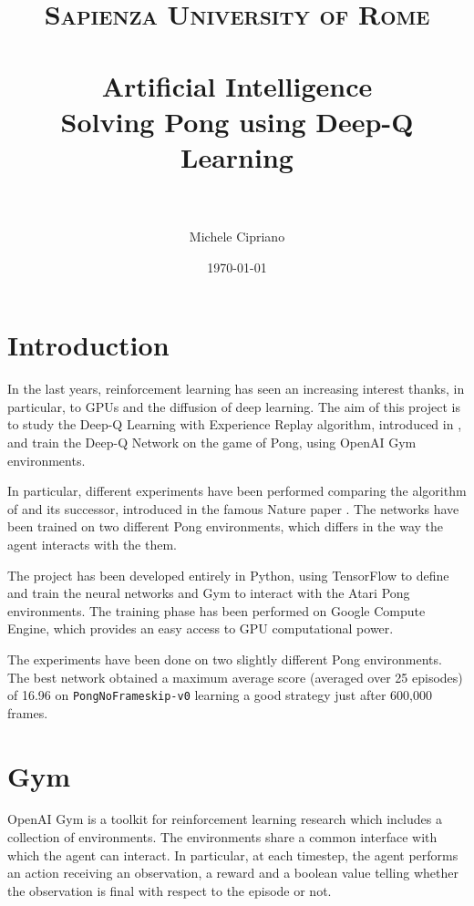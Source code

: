 \documentclass[a4paper]{article}
\title{
\normalfont \normalsize
\textsc{Sapienza University of Rome} \\ [25pt] %
\horrule{0.5pt} \\[0.4cm] %
\LARGE Artificial Intelligence \\ %
\large Solving Pong using Deep-Q Learning \\
\horrule{2pt} \\[0.5cm] %
}
\author{Michele Cipriano} %
\date{\normalsize\today} %
\numberwithin{equation}{section} %
\numberwithin{figure}{section} %
\numberwithin{table}{section} %
\theoremstyle{definition}
\begin{document}
\sloppy %

\maketitle %


\section{Introduction}

In the last years, reinforcement learning has seen an increasing interest thanks,
in particular, to GPUs and the diffusion of deep learning. The aim of this
project is to study the Deep-Q Learning with Experience Replay
algorithm, introduced in \cite{mnih2013playing}, and train
the Deep-Q Network on the game of Pong, using OpenAI Gym environments\cite{openai-gym}.

In particular, different experiments have been performed comparing the algorithm
of \cite{mnih2013playing} and its successor, introduced in the famous Nature
paper \cite{mnih2015humanlevel}. The networks have been trained on two different
Pong environments, which differs in the way the agent interacts with the them.

The project has been developed entirely in Python, using TensorFlow to define and
train the neural networks and Gym to interact with the Atari Pong environments.
The training phase has been performed on Google Compute Engine, which provides an
easy access to GPU computational power.

The experiments have been done on two slightly different Pong environments.
The best network obtained a maximum average score (averaged over 25 episodes) of
16.96 on \texttt{PongNoFrameskip-v0} learning a good
strategy just after 600,000 frames.


\section{Gym}

OpenAI Gym is a toolkit for reinforcement learning research which includes a
collection of environments. The environments share a common interface with which
the agent can interact. In particular, at each timestep, the agent performs an
action receiving an observation, a reward and a boolean value telling whether the
observation is final with respect to the episode or not.
\end{document}
